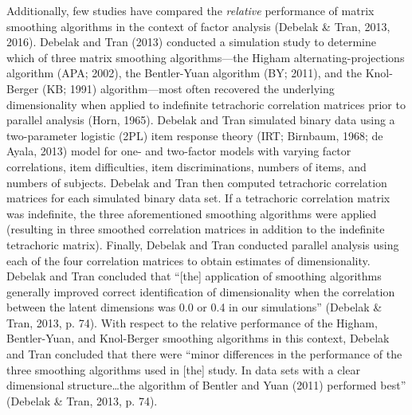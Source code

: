 \documentclass[
  english,
  man]{apa6}
\begin{document}
Additionally, few studies have compared the \emph{relative} performance of matrix smoothing algorithms in the context of factor analysis (Debelak \& Tran, 2013, 2016). Debelak and Tran (2013) conducted a simulation study to determine which of three matrix smoothing algorithms---the Higham alternating-projections algorithm (APA; 2002), the Bentler-Yuan algorithm (BY; 2011), and the Knol-Berger (KB; 1991) algorithm---most often recovered the underlying dimensionality when applied to indefinite tetrachoric correlation matrices prior to parallel analysis (Horn, 1965). Debelak and Tran simulated binary data using a two-parameter logistic (2PL) item response theory (IRT; Birnbaum, 1968; de Ayala, 2013) model for one- and two-factor models with varying factor correlations, item difficulties, item discriminations, numbers of items, and numbers of subjects. Debelak and Tran then computed tetrachoric correlation matrices for each simulated binary data set. If a tetrachoric correlation matrix was indefinite, the three aforementioned smoothing algorithms were applied (resulting in three smoothed correlation matrices in addition to the indefinite tetrachoric matrix). Finally, Debelak and Tran conducted parallel analysis using each of the four correlation matrices to obtain estimates of dimensionality. Debelak and Tran concluded that \enquote{{[}the{]} application of smoothing algorithms generally improved correct identification of dimensionality when the correlation between the latent dimensions was 0.0 or 0.4 in our simulations} (Debelak \& Tran, 2013, p. 74). With respect to the relative performance of the Higham, Bentler-Yuan, and Knol-Berger smoothing algorithms in this context, Debelak and Tran concluded that there were \enquote{minor differences in the performance of the three smoothing algorithms used in {[}the{]} study. In data sets with a clear dimensional structure\ldots the algorithm of Bentler and Yuan (2011) performed best} (Debelak \& Tran, 2013, p. 74).
\end{document}
